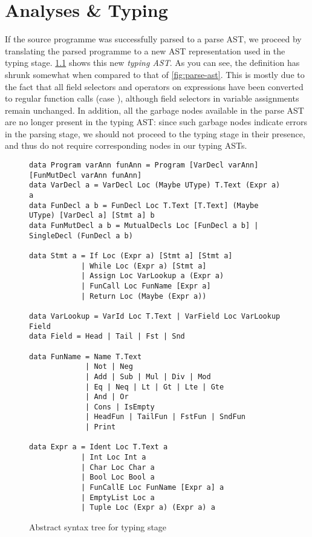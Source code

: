 \chapter{Analyses \& Typing}

If the source programme was successfully parsed to a parse AST, we proceed by
translating the parsed programme to a new AST representation used in
the typing stage.
\cref{fig:type-ast} shows this new \emph{typing AST}.
As you can see, the definition has shrunk somewhat when compared to that of
\cref{fig:parse-ast}. This is mostly due to the fact that all field selectors
and operators on expressions have been converted to regular function calls (case
), although field selectors in variable assignments remain
unchanged.
In addition, all the garbage nodes available in the parse AST are no longer
present in the typing AST: since such garbage nodes indicate errors in the
parsing stage, we should not proceed to the typing stage in their presence, and
thus do not require corresponding nodes in our typing ASTs.

\begin{figure}
\begin{verbatim}
data Program varAnn funAnn = Program [VarDecl varAnn] [FunMutDecl varAnn funAnn]
data VarDecl a = VarDecl Loc (Maybe UType) T.Text (Expr a) a
data FunDecl a b = FunDecl Loc T.Text [T.Text] (Maybe UType) [VarDecl a] [Stmt a] b
data FunMutDecl a b = MutualDecls Loc [FunDecl a b] | SingleDecl (FunDecl a b)

data Stmt a = If Loc (Expr a) [Stmt a] [Stmt a]
            | While Loc (Expr a) [Stmt a]
            | Assign Loc VarLookup a (Expr a)
            | FunCall Loc FunName [Expr a]
            | Return Loc (Maybe (Expr a))

data VarLookup = VarId Loc T.Text | VarField Loc VarLookup Field
data Field = Head | Tail | Fst | Snd

data FunName = Name T.Text
             | Not | Neg
             | Add | Sub | Mul | Div | Mod
             | Eq | Neq | Lt | Gt | Lte | Gte
             | And | Or
             | Cons | IsEmpty
             | HeadFun | TailFun | FstFun | SndFun
             | Print

data Expr a = Ident Loc T.Text a
            | Int Loc Int a
            | Char Loc Char a
            | Bool Loc Bool a
            | FunCallE Loc FunName [Expr a] a
            | EmptyList Loc a
            | Tuple Loc (Expr a) (Expr a) a
\end{verbatim}

\caption{Abstract syntax tree for typing stage}
\label{fig:type-ast}
\end{figure}

